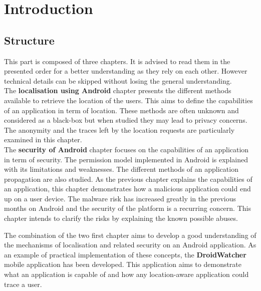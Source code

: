

\chapter*{Introduction}
\label{chap:andro-intro}

\section*{Structure}
\label{sec:intro-andro-structure}
This part is composed of three chapters.
It is advised to read them in the presented order for a better understanding as they rely on each other.
However technical details can be skipped without losing the general understanding.\\

The \textbf{localisation using Android} chapter presents the different methods available to retrieve the location of the users.
This aims to define the capabilities of an application in term of location.
These methods are often unknown and considered as a black-box but when studied they may lead to privacy concerns.
The anonymity and the traces left by the location requests are particularly examined in this chapter.\\

The \textbf{security of Android} chapter focuses on the capabilities of an application in term of security.
The permission model implemented in Android is explained with its limitations and weaknesses.
The different methods of an application propagation are also studied.
As the previous chapter explains the capabilities of an application, this chapter demonstrates how a malicious application could end up on a user device.
The malware risk has increased greatly in the previous months on Android and the security of the platform is a recurring concern.
This chapter intends to clarify the risks by explaining the known possible abuses.

The combination of the two first chapter aims to develop a good understanding of the mechanisms of localisation and related security on an Android application.
As an example of practical implementation of these concepts, the \textbf{DroidWatcher} mobile application has been developed.
This application aims to demonstrate what an application is capable of and how any location-aware application could trace a user.

